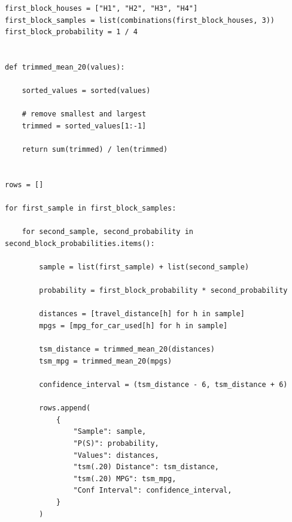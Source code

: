 \documentclass[12pt]{article}
\begin{document}
\begin{lstlisting}
first_block_houses = ["H1", "H2", "H3", "H4"]
first_block_samples = list(combinations(first_block_houses, 3))
first_block_probability = 1 / 4


def trimmed_mean_20(values):

    sorted_values = sorted(values)

    # remove smallest and largest
    trimmed = sorted_values[1:-1]

    return sum(trimmed) / len(trimmed)


rows = []

for first_sample in first_block_samples:

    for second_sample, second_probability in second_block_probabilities.items():

        sample = list(first_sample) + list(second_sample)

        probability = first_block_probability * second_probability

        distances = [travel_distance[h] for h in sample]
        mpgs = [mpg_for_car_used[h] for h in sample]

        tsm_distance = trimmed_mean_20(distances)
        tsm_mpg = trimmed_mean_20(mpgs)

        confidence_interval = (tsm_distance - 6, tsm_distance + 6)

        rows.append(
            {
                "Sample": sample,
                "P(S)": probability,
                "Values": distances,
                "tsm(.20) Distance": tsm_distance,
                "tsm(.20) MPG": tsm_mpg,
                "Conf Interval": confidence_interval,
            }
        )
\end{lstlisting}
\end{document}

